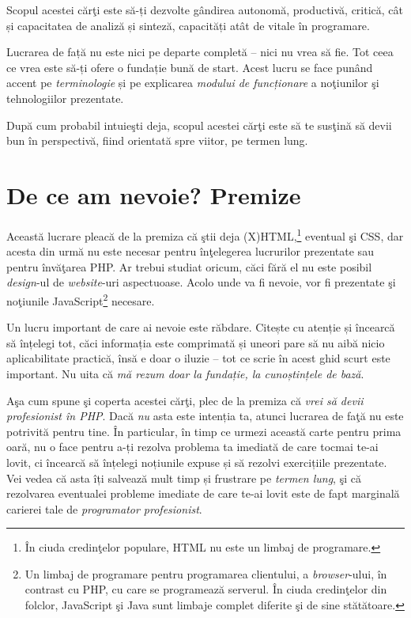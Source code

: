 Scopul acestei cărţi este să-ți dezvolte gândirea autonomă, productivă,
critică, cât și capacitatea de analiză și sinteză, capacități atât de vitale
în programare.

Lucrarea de față nu este nici pe departe completă -- nici nu vrea să fie.
Tot ceea ce vrea este să-ți ofere o fundație bună de start. Acest lucru se 
face punând accent pe \textit{terminologie} și pe explicarea
\textit{modului de funcționare} a noţiunilor şi tehnologiilor prezentate.

După cum probabil intuieşti deja, scopul acestei cărţi este să
te susţină să devii bun în perspectivă, fiind orientată spre
viitor, pe termen lung.

{}
\section*{De ce am nevoie? Premize}
Această lucrare pleacă de la premiza că ştii deja (X)HTML,\footnote{În
ciuda credinţelor populare, HTML nu este un limbaj de programare.} eventual şi CSS, dar
acesta din urmă nu este necesar pentru înţelegerea lucrurilor prezentate
sau pentru învăţarea PHP. Ar trebui
studiat oricum, căci fără el nu este posibil \textsl{design}-ul de
\textsl{website}-uri aspectuoase.
Acolo unde va fi nevoie, vor fi prezentate şi noţiunile JavaScript\footnote{Un
limbaj de programare pentru programarea clientului, a \textsl{browser}-ului,
în contrast cu PHP, cu care se programează \glqq serverul\grqq.
În ciuda credinţelor din folclor, JavaScript şi Java sunt limbaje complet
diferite şi de sine stătătoare.} necesare.

Un lucru important de care ai nevoie este răbdare. Citește cu
atenție și încearcă să înțelegi tot, căci informația este comprimată
și uneori pare să nu aibă nicio aplicabilitate practică, însă e doar o
iluzie -- tot ce scrie în acest ghid scurt este important. Nu uita că
\textit{mă rezum doar la fundație, la cunoștințele de bază}.

Aşa cum spune şi coperta acestei cărţi, plec de la premiza că
\textit{vrei să devii profesionist în PHP}. Dacă \textit{nu} asta este intenția ta,
atunci lucrarea de faţă nu este potrivită pentru tine.
În particular, în timp ce urmezi această carte pentru prima oară, nu o face
pentru a-ți rezolva problema ta imediată de care tocmai te-ai lovit, ci
încearcă să înțelegi noțiunile expuse și să rezolvi exercițiile prezentate.
Vei vedea că asta îți salvează mult timp și frustrare pe \textit{termen lung},
şi că rezolvarea eventualei probleme imediate de care te-ai lovit este de fapt
marginală carierei tale de \textit{programator profesionist}.

